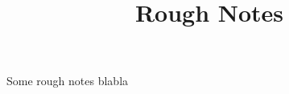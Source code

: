 \documentclass{article}
\title{Rough Notes}
\begin{document}
    \maketitle
    Some rough notes
    blabla
\end{document}
